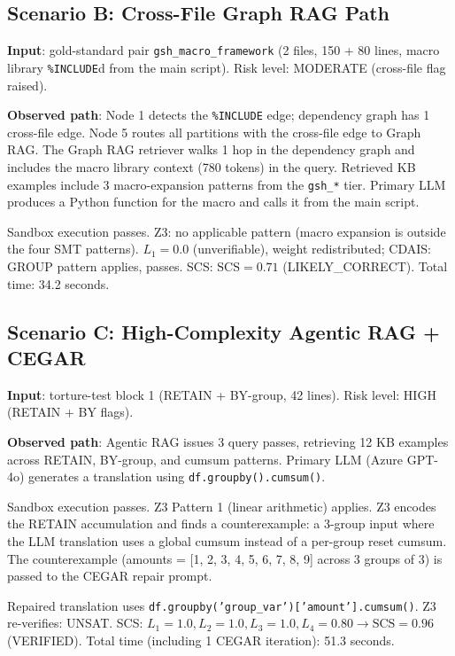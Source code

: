 \subsection{Scenario B: Cross-File Graph RAG Path}
\label{subsec:scenario-b}

\textbf{Input}: gold-standard pair \texttt{gsh\_macro\_framework} (2 files,
150 + 80 lines, macro library \texttt{\%INCLUDE}d from the main script).
Risk level: MODERATE (cross-file flag raised).

\textbf{Observed path}: Node 1 detects the \texttt{\%INCLUDE} edge; dependency
graph has 1 cross-file edge. Node 5 routes all partitions with the cross-file
edge to Graph RAG. The Graph RAG retriever walks 1 hop in the dependency graph
and includes the macro library context (780 tokens) in the query. Retrieved
KB examples include 3 macro-expansion patterns from the \texttt{gsh\_*} tier.
Primary LLM produces a Python function for the macro and calls it from the main
script.

Sandbox execution passes. Z3: no applicable pattern (macro expansion is outside
the four SMT patterns). $L_1=0.0$ (unverifiable), weight redistributed;
CDAIS: GROUP pattern applies, passes.
SCS: $\mathrm{SCS}=0.71$ (LIKELY\_CORRECT). Total time: 34.2 seconds.

\subsection{Scenario C: High-Complexity Agentic RAG + CEGAR}
\label{subsec:scenario-c}

\textbf{Input}: torture-test block 1 (RETAIN + BY-group, 42 lines).
Risk level: HIGH (RETAIN + BY flags).

\textbf{Observed path}: Agentic RAG issues 3 query passes, retrieving
12 KB examples across RETAIN, BY-group, and cumsum patterns. Primary LLM
(Azure GPT-4o) generates a translation using \texttt{df.groupby().cumsum()}.

Sandbox execution passes. Z3 Pattern 1 (linear arithmetic) applies. Z3
encodes the RETAIN accumulation and finds a counterexample: a 3-group input
where the LLM translation uses a global cumsum instead of a per-group reset
cumsum. The counterexample (amounts = [1, 2, 3, 4, 5, 6, 7, 8, 9] across 3
groups of 3) is passed to the CEGAR repair prompt.

Repaired translation uses
\texttt{df.groupby('group\_var')['amount'].cumsum()}. Z3 re-verifies: UNSAT.
SCS: $L_1=1.0, L_2=1.0, L_3=1.0, L_4=0.80 \rightarrow \mathrm{SCS}=0.96$
(VERIFIED). Total time (including 1 CEGAR iteration): 51.3 seconds.

